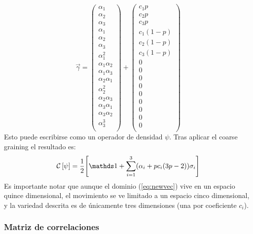 \begin{equation}
\vec{\gamma}=\begin{pmatrix}
\alpha_{1}\\
\alpha_{2}\\
\alpha_{3}\\
\alpha_{1}\\
\alpha_{2}\\
\alpha_{3}\\
\alpha_{1}^{2}\\
\alpha_{1}\alpha_{2}\\
\alpha_{1}\alpha_{3}\\
\alpha_{2}\alpha_{1}\\
\alpha_{2}^{2}\\
\alpha_{2}\alpha_{3}\\
\alpha_{3}\alpha_{1}\\
\alpha_{3}\alpha_{2}\\
\alpha_{3}^{3}\\
\end{pmatrix}+\begin{pmatrix}
c_{1}p\\
c_{2}p\\
c_{3}p\\
c_{1}(1-p)\\
c_{2}(1-p)\\
c_{3}(1-p)\\
0\\
0\\
0\\
0\\
0\\
0\\
0\\
0\\
0\\
\end{pmatrix}\label{eq:newvec}
\end{equation}
Esto puede escribirse como un operador de densidad $\psi$. Tras aplicar el coarse graining el resultado es:
\begin{equation}
    \CG{\psi} = \frac{1}{2}\qty[\Id + \sum_{i=1}^3(\alpha_{i}+pc_{i}(3p-2))\sigma_i]\label{eq:newcoarse}
\end{equation}
Es importante notar que aunque el dominio (\ref{eq:newvec}) vive en un espacio quince dimensional, el movimiento se ve limitado a un espacio cinco dimensional, y la variedad descrita es de únicamente tres dimensiones (una por coeficiente $c_{i}$).

\subsubsection{Matriz de correlaciones}

